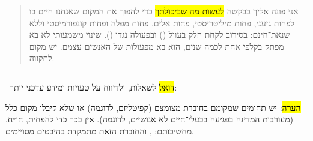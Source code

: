\setlength\parindent{0cm}

\vfill


\vfill

\begin{quote}
	אני פונה אליך בבקשה \hl{לעשות מה שביכולתך} כדי להפוך את המקום שאנחנו חיים בו לפחות גזעני, פחות מיליטריסטי, פחות אלים, פחות מפלה ופחות קונפורמיסטי וללא שנאת־חינם: בסירוב לקחת חלק בעוול () ובפעולה נגדו (). שינוי משמעותי לא בא מפתק בקלפי אחת לכמה שנים, הוא בא מפעולות של האנשים עצמם. יש מקום לתקווה.~\hfill{}
\end{quote}

\vfill


\vfill


\begin{center}
\end{center}

\vfill

\hrule

~\hfill \hl{דואל} לשאלות, ולדיווח על טעויות ומידע עדכני יותר: \hfill~

\small \hl{הערה}: יש תחומים שמקומם בחוברת מצומצם (קפיטליזם, לדוגמה) או שלא קיבלו מקום כלל (מעורבות המדינה בפגיעה בבעלי־חיים לא אנושיים, לדוגמה). אין בכך כדי להפחית, חו״ח, מחשיבותם: , והחוברת הזאת מתמקדת בהיבטים מסויימים.
